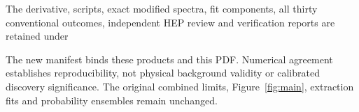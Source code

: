 The derivative, scripts, exact modified spectra, fit components, all thirty conventional outcomes, independent HEP review and verification reports are retained under
\begin{center}\small{}\end{center}
The new manifest binds these products and this PDF. Numerical agreement establishes reproducibility, not physical background validity or calibrated discovery significance. The original combined limits, Figure~\ref{fig:main}, extraction fits and probability ensembles remain unchanged.
